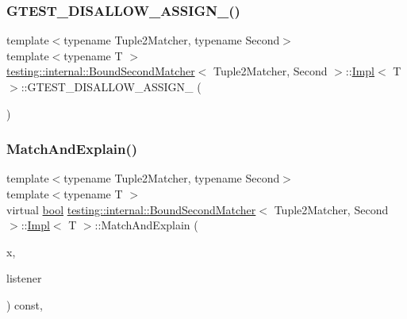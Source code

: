 \subsubsection{\texorpdfstring{G\+T\+E\+S\+T\+\_\+\+D\+I\+S\+A\+L\+L\+O\+W\+\_\+\+A\+S\+S\+I\+G\+N\+\_\+()}{GTEST\_DISALLOW\_ASSIGN\_()}}
{\footnotesize\ttfamily template$<$typename Tuple2\+Matcher, typename Second$>$ \\
template$<$typename T $>$ \\
\hyperlink{classtesting_1_1internal_1_1BoundSecondMatcher}{testing\+::internal\+::\+Bound\+Second\+Matcher}$<$ Tuple2\+Matcher, Second $>$\+::\hyperlink{classtesting_1_1internal_1_1BoundSecondMatcher_1_1Impl}{Impl}$<$ T $>$\+::G\+T\+E\+S\+T\+\_\+\+D\+I\+S\+A\+L\+L\+O\+W\+\_\+\+A\+S\+S\+I\+G\+N\+\_\+ (\begin{DoxyParamCaption}\item[{\hyperlink{classtesting_1_1internal_1_1BoundSecondMatcher_1_1Impl}{Impl}$<$ T $>$}]{ }\end{DoxyParamCaption})\hspace{0.3cm}{\ttfamily [private]}}

\mbox{\label{classtesting_1_1internal_1_1BoundSecondMatcher_1_1Impl_ae56a4b11434e351d640aceaf82c78be1}} 
\subsubsection{\texorpdfstring{Match\+And\+Explain()}{MatchAndExplain()}}
{\footnotesize\ttfamily template$<$typename Tuple2\+Matcher, typename Second$>$ \\
template$<$typename T $>$ \\
virtual \hyperlink{classbool}{bool} \hyperlink{classtesting_1_1internal_1_1BoundSecondMatcher}{testing\+::internal\+::\+Bound\+Second\+Matcher}$<$ Tuple2\+Matcher, Second $>$\+::\hyperlink{classtesting_1_1internal_1_1BoundSecondMatcher_1_1Impl}{Impl}$<$ T $>$\+::Match\+And\+Explain (\begin{DoxyParamCaption}\item[{T}]{x,  }\item[{\hyperlink{classtesting_1_1MatchResultListener}{Match\+Result\+Listener} $\ast$}]{listener }\end{DoxyParamCaption}) const\hspace{0.3cm}{\ttfamily [inline]}, {\ttfamily [virtual]}}



